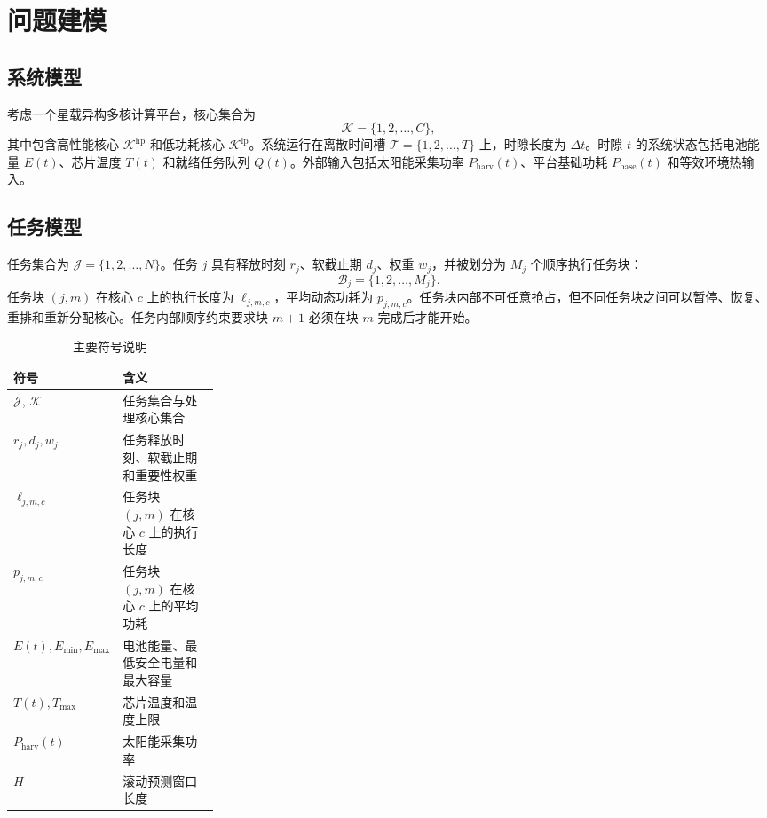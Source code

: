 \section{问题建模}

\subsection{系统模型}

考虑一个星载异构多核计算平台，核心集合为
\begin{equation}
  \mathcal{K}=\{1,2,\dots,C\},
\end{equation}
其中包含高性能核心 $\mathcal{K}^{\mathrm{hp}}$ 和低功耗核心 $\mathcal{K}^{\mathrm{lp}}$。系统运行在离散时间槽 $\mathcal{T}=\{1,2,\dots,T\}$ 上，时隙长度为 $\Delta t$。时隙 $t$ 的系统状态包括电池能量 $E(t)$、芯片温度 $T(t)$ 和就绪任务队列 $Q(t)$。外部输入包括太阳能采集功率 $P_{\mathrm{harv}}(t)$、平台基础功耗 $P_{\mathrm{base}}(t)$ 和等效环境热输入。

\subsection{任务模型}

任务集合为 $\mathcal{J}=\{1,2,\dots,N\}$。任务 $j$ 具有释放时刻 $r_j$、软截止期 $d_j$、权重 $w_j$，并被划分为 $M_j$ 个顺序执行任务块：
\begin{equation}
  \mathcal{B}_j=\{1,2,\dots,M_j\}.
\end{equation}
任务块 $(j,m)$ 在核心 $c$ 上的执行长度为 $\ell_{j,m,c}$，平均动态功耗为 $p_{j,m,c}$。任务块内部不可任意抢占，但不同任务块之间可以暂停、恢复、重排和重新分配核心。任务内部顺序约束要求块 $m+1$ 必须在块 $m$ 完成后才能开始。

\begin{table}[t]
\centering
\caption{主要符号说明}
\label{tab:notation}
\begin{tabularx}{\linewidth}{p{0.27\linewidth}X}
\toprule
符号 & 含义 \\
\midrule
$\mathcal{J}$, $\mathcal{K}$ & 任务集合与处理核心集合 \\
$r_j,d_j,w_j$ & 任务释放时刻、软截止期和重要性权重 \\
$\ell_{j,m,c}$ & 任务块 $(j,m)$ 在核心 $c$ 上的执行长度 \\
$p_{j,m,c}$ & 任务块 $(j,m)$ 在核心 $c$ 上的平均功耗 \\
$E(t),E_{\min},E_{\max}$ & 电池能量、最低安全电量和最大容量 \\
$T(t),T_{\max}$ & 芯片温度和温度上限 \\
$P_{\mathrm{harv}}(t)$ & 太阳能采集功率 \\
$H$ & 滚动预测窗口长度 \\
\bottomrule
\end{tabularx}
\end{table}

